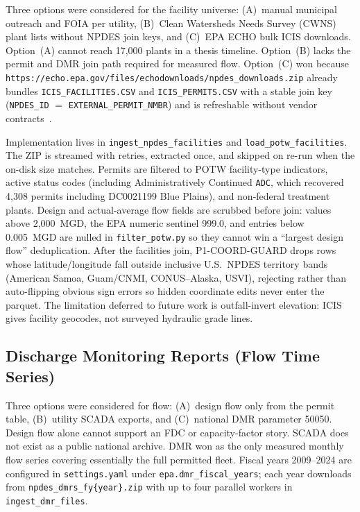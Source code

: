\documentclass[12pt,letterpaper]{report}
\begin{document}
Three options were considered for the facility universe: (A)~manual municipal
outreach and FOIA per utility, (B)~Clean Watersheds Needs Survey (CWNS) plant
lists without NPDES join keys, and (C)~EPA ECHO bulk ICIS downloads. Option~(A)
cannot reach 17,000 plants in a thesis timeline. Option~(B) lacks the permit and
DMR join path required for measured flow. Option~(C) won because
\texttt{https://echo.epa.gov/files/echodownloads/npdes\_downloads.zip} already
bundles \texttt{ICIS\_FACILITIES.CSV} and \texttt{ICIS\_PERMITS.CSV} with a
stable join key (\texttt{NPDES\_ID} $=$ \texttt{EXTERNAL\_PERMIT\_NMBR}) and is
refreshable without vendor contracts~\cite{epa_echo}.

Implementation lives in \texttt{ingest\_npdes\_facilities} and
\texttt{load\_potw\_facilities}. The ZIP is streamed with retries, extracted once,
and skipped on re-run when the on-disk size matches. Permits are filtered to POTW
facility-type indicators, active status codes (including Administratively Continued
\texttt{ADC}, which recovered 4,308 permits including DC0021199 Blue Plains), and
non-federal treatment plants. Design and actual-average flow fields are scrubbed
before join: values above 2,000~MGD, the EPA numeric sentinel 999.0, and entries
below 0.005~MGD are nulled in \texttt{filter\_potw.py} so they cannot win a
``largest design flow'' deduplication. After the facilities join, P1-COORD-GUARD
drops rows whose latitude/longitude fall outside inclusive U.S.\ NPDES territory
bands (American Samoa, Guam/CNMI, CONUS--Alaska, USVI), rejecting rather than
auto-flipping obvious sign errors so hidden coordinate edits never enter the
parquet. The limitation deferred to future work is outfall-invert elevation: ICIS
gives facility geocodes, not surveyed hydraulic grade lines.

\subsection{Discharge Monitoring Reports (Flow Time Series)}

Three options were considered for flow: (A)~design flow only from the permit table,
(B)~utility SCADA exports, and (C)~national DMR parameter 50050. Design flow alone
cannot support an FDC or capacity-factor story. SCADA does not exist as a public
national archive. DMR won as the only measured monthly flow series covering
essentially the full permitted fleet. Fiscal years 2009--2024 are configured in
\texttt{settings.yaml} under \texttt{epa.dmr\_fiscal\_years}; each year downloads
from \texttt{npdes\_dmrs\_fy\{year\}.zip} with up to four parallel workers in
\texttt{ingest\_dmr\_files}.
\end{document}
